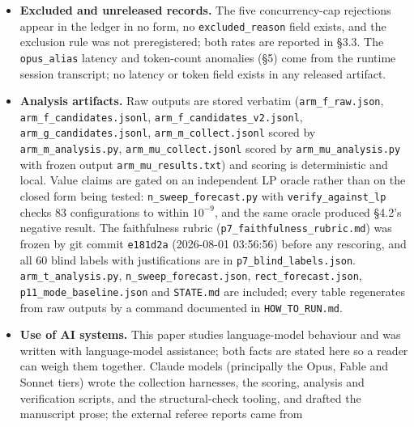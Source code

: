 \documentclass[11pt]{article}
\begin{document}
\begin{itemize}
  raw output, arm label and sample id is byte-identical to v1, verified field by field, each
  corrected field carrying a sibling \texttt{*\_v1} field. \texttt{arm\_f\_candidates.jsonl} is unmodified
  (sha256 \texttt{02ecabcd\dots}); v2 is \texttt{9f845f78\dots}. Correction rules, sources, wave-boundary arithmetic
  and caveats --- including that \texttt{run\_date} has day granularity only --- are in
  \textbf{\texttt{ledger\_v2\_corrections.md}}. Analysis scripts read v2.
\item \textbf{Excluded and unreleased records.} The five concurrency-cap rejections appear in the ledger
  in no form, no \texttt{excluded\_reason} field exists, and the exclusion rule was not preregistered;
  both rates are reported in \S3.3. The \texttt{opus\_alias} latency and token-count anomalies (\S5) come
  from the runtime session transcript; no latency or token field exists in any released artifact.
\item \textbf{Analysis artifacts.} Raw outputs are stored verbatim (\texttt{arm\_f\_raw.json},
  \texttt{arm\_f\_candidates.jsonl}, \texttt{arm\_f\_candidates\_v2.jsonl}, \texttt{arm\_g\_candidates.jsonl},
  \texttt{arm\_m\_collect.jsonl} scored by \texttt{arm\_m\_analysis.py},
  \texttt{arm\_mu\_collect.jsonl} scored by \texttt{arm\_mu\_analysis.py} with frozen output
  \texttt{arm\_mu\_results.txt}) and scoring is
  deterministic and local. Value claims are gated on an independent LP oracle rather than on the
  closed form being tested: \texttt{n\_sweep\_forecast.py} with \texttt{verify\_against\_lp} checks 83
  configurations to within $10^{-9}$, and the same oracle produced \S4.2's negative result. The
  faithfulness rubric (\texttt{p7\_faithfulness\_rubric.md}) was frozen by git commit \texttt{e181d2a}
  (2026-08-01 03:56:56) before any rescoring, and all 60 blind labels with justifications are in
  \texttt{p7\_blind\_labels.json}. \texttt{arm\_t\_analysis.py}, \texttt{n\_sweep\_forecast.json}, \texttt{rect\_forecast.json},
  \texttt{p11\_mode\_baseline.json} and \texttt{STATE.md} are included; every table regenerates from raw outputs
  by a command documented in \texttt{HOW\_TO\_RUN.md}.
\item \textbf{Use of AI systems.} This paper studies language-model behaviour and was written
  with language-model assistance; both facts are stated here so a reader can weigh them
  together. Claude models (principally the Opus, Fable and Sonnet tiers) wrote the collection
  harnesses, the scoring, analysis and verification scripts, and the structural-check tooling,
  and drafted the manuscript prose; the external referee reports came from

\end{itemize}
\end{document}
